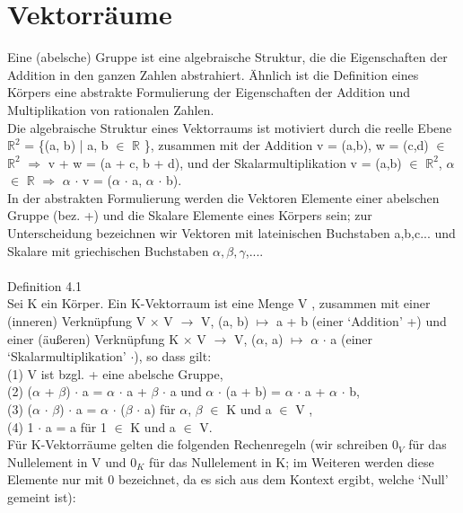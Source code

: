 \section{Vektorräume}
Eine (abelsche) Gruppe ist eine algebraische Struktur, die die Eigenschaften der Addition in den ganzen Zahlen abstrahiert. Ähnlich ist die Definition eines Körpers eine abstrakte Formulierung der Eigenschaften der Addition und Multiplikation von rationalen Zahlen.\\
Die algebraische Struktur eines Vektorraums ist motiviert durch die reelle Ebene $\mathbb{R}^2$ = \{(a, b) | a, b $\in$ $\mathbb{R}$ \}, zusammen mit der Addition v = (a,b), w = (c,d) $\in$ $\mathbb{R}^2$ $\Rightarrow$ v + w = (a + c, b + d), und der Skalarmultiplikation v = (a,b) $\in$ $\mathbb{R}^2$, $\alpha$ $\in$ $\mathbb{R}$ $\Rightarrow$ $\alpha$ $\cdot$ v = ($\alpha$ $\cdot$ a, $\alpha$ $\cdot$ b).\\ 
In der abstrakten Formulierung werden die Vektoren Elemente einer abelschen Gruppe (bez. +) und die Skalare Elemente eines Körpers sein; zur Unterscheidung bezeichnen wir Vektoren mit lateinischen Buchstaben a,b,c... und Skalare mit griechischen Buchstaben $\alpha, \beta, \gamma$,....\\
\\
Definition 4.1\\
Sei K ein Körper. Ein K-Vektorraum ist eine Menge V , zusammen mit einer (inneren) Verknüpfung V $\times$ V $\to$ V, (a, b) $\mapsto$ a + b (einer ‘Addition’ +) und einer (äußeren) Verknüpfung K $\times$ V $\to$ V, ($\alpha$, a) $\mapsto$ $\alpha$ $\cdot$ a (einer ‘Skalarmultiplikation’ $\cdot$), so dass gilt: \\
(1) V ist bzgl. + eine abelsche Gruppe, \\
(2) ($\alpha$ + $\beta$) $\cdot$ a = $\alpha$ $\cdot$ a + $\beta$ $\cdot$ a und $\alpha$ $\cdot$ (a + b) = $\alpha$ $\cdot$ a + $\alpha$ $\cdot$ b,\\ 
(3) ($\alpha$ $\cdot$ $\beta$) $\cdot$ a = $\alpha$ $\cdot$ ($\beta$ $\cdot$ a) für $\alpha$, $\beta$ $\in$ K und a $\in$ V ,\\ 
(4) 1 $\cdot$ a = a für 1 $\in$ K und a $\in$ V.\\
Für K-Vektorräume gelten die folgenden Rechenregeln (wir schreiben 0$_V$ für das Nullelement in V und 0$_K$ für das Nullelement in K; im Weiteren werden diese Elemente nur mit 0 bezeichnet, da es sich aus dem Kontext ergibt, welche ‘Null’ gemeint ist):
